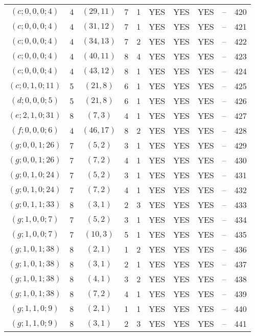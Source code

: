 \begin{longtable}{|c|c|c|c|c|c|c|c|c|c|}
$(c; 0, 0, 0; 4)$ & 4 & $(29, 11)$ & 7 & 1 & YES & YES & YES & -- & 420\\
$(c; 0, 0, 0; 4)$ & 4 & $(31, 12)$ & 7 & 1 & YES & YES & YES & -- & 421\\
$(c; 0, 0, 0; 4)$ & 4 & $(34, 13)$ & 7 & 2 & YES & YES & YES & -- & 422\\
$(c; 0, 0, 0; 4)$ & 4 & $(40, 11)$ & 8 & 4 & YES & YES & YES & -- & 423\\
$(c; 0, 0, 0; 4)$ & 4 & $(43, 12)$ & 8 & 1 & YES & YES & YES & -- & 424\\
$(c; 0, 1, 0; 11)$ & 5 & $(21, 8)$ & 6 & 1 & YES & YES & YES & -- & 425\\
$(d; 0, 0, 0; 5)$ & 5 & $(21, 8)$ & 6 & 1 & YES & YES & YES & -- & 426\\
$(e; 2, 1, 0; 31)$ & 8 & $(7, 3)$ & 4 & 1 & YES & YES & YES & -- & 427\\
$(f; 0, 0, 0; 6)$ & 4 & $(46, 17)$ & 8 & 2 & YES & YES & YES & -- & 428\\
$(g; 0, 0, 1; 26)$ & 7 & $(5, 2)$ & 3 & 1 & YES & YES & YES & -- & 429\\
$(g; 0, 0, 1; 26)$ & 7 & $(7, 2)$ & 4 & 1 & YES & YES & YES & -- & 430\\
$(g; 0, 1, 0; 24)$ & 7 & $(5, 2)$ & 3 & 1 & YES & YES & YES & -- & 431\\
$(g; 0, 1, 0; 24)$ & 7 & $(7, 2)$ & 4 & 1 & YES & YES & YES & -- & 432\\
$(g; 0, 1, 1; 33)$ & 8 & $(3, 1)$ & 2 & 3 & YES & YES & YES & -- & 433\\
$(g; 1, 0, 0; 7)$ & 7 & $(5, 2)$ & 3 & 1 & YES & YES & YES & -- & 434\\
$(g; 1, 0, 0; 7)$ & 7 & $(10, 3)$ & 5 & 1 & YES & YES & YES & -- & 435\\
$(g; 1, 0, 1; 38)$ & 8 & $(2, 1)$ & 1 & 2 & YES & YES & YES & -- & 436\\
$(g; 1, 0, 1; 38)$ & 8 & $(3, 1)$ & 2 & 1 & YES & YES & YES & -- & 437\\
$(g; 1, 0, 1; 38)$ & 8 & $(4, 1)$ & 3 & 2 & YES & YES & YES & -- & 438\\
$(g; 1, 0, 1; 38)$ & 8 & $(7, 2)$ & 4 & 1 & YES & YES & YES & -- & 439\\
$(g; 1, 1, 0; 9)$ & 8 & $(2, 1)$ & 1 & 1 & YES & YES & YES & -- & 440\\
$(g; 1, 1, 0; 9)$ & 8 & $(3, 1)$ & 2 & 3 & YES & YES & YES & -- & 441
\end{longtable}
